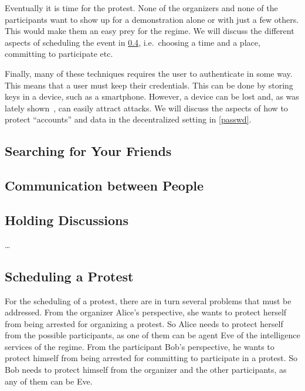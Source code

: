 Eventually it is time for the protest.
None of the organizers and none of the participants want to show up for 
a demonstration alone or with just a few others.
This would make them an easy prey for the regime.
We will discuss the different aspects of scheduling the event in 
\cref{Scheduling}, i.e.\ choosing a time and a place, committing to participate 
etc.

Finally, many of these techniques requires the user to authenticate in some 
way.
This means that a user must keep their credentials.
This can be done by storing keys in a device, such as a smartphone.
However, a device can be lost and, as was lately shown~\cite{AppleVsFBI}, can 
easily attract attacks.
We will discuss the aspects of how to protect \enquote{accounts} and data in 
the decentralized setting in \cref{passwd}.

\subsection{Searching for Your Friends}
\label{UserSearch}





\subsection{Communication between People}
\label{Communicating}



\subsection{Holding Discussions}
\label{Discussions}

\citet{multiotr2009} \dots



\subsection{Scheduling a Protest}
\label{Scheduling}

For the scheduling of a protest, there are in turn several problems that must 
be addressed.
From the organizer Alice's perspective, she wants to protect herself from being 
arrested for organizing a protest.
So Alice needs to protect herself from the possible participants, as one of 
them can be agent Eve of the intelligence services of the regime.
From the participant Bob's perspective, he wants to protect himself from being 
arrested for committing to participate in a protest.
So Bob needs to protect himself from the organizer and the other participants, 
as any of them can be Eve.

